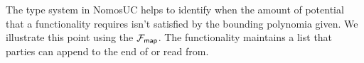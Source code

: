 %
%
%
%
%
%
%
%
%
%
%
%
%


The type system in NomosUC helps to identify when the amount of potential that a functionality requires isn't satisfied by the bounding polynomia given.
We illustrate this point using the $\mathcal{F}_{{\mathsf {map}}}$. 
The functionality maintains a list that parties can append to the end of or read from.

